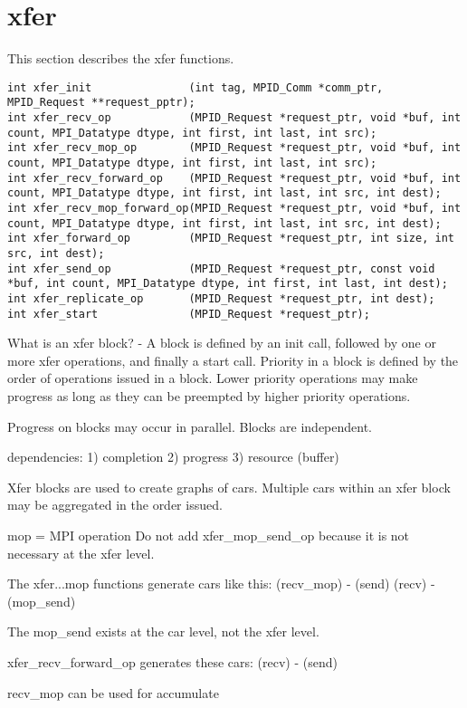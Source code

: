 \documentclass[dvipdfm,twoside,11pt]{article}
\begin{document}
\section{xfer}
This section describes the xfer functions.
\begin{verbatim}
int xfer_init               (int tag, MPID_Comm *comm_ptr, MPID_Request **request_pptr);
int xfer_recv_op            (MPID_Request *request_ptr, void *buf, int count, MPI_Datatype dtype, int first, int last, int src);
int xfer_recv_mop_op        (MPID_Request *request_ptr, void *buf, int count, MPI_Datatype dtype, int first, int last, int src);
int xfer_recv_forward_op    (MPID_Request *request_ptr, void *buf, int count, MPI_Datatype dtype, int first, int last, int src, int dest);
int xfer_recv_mop_forward_op(MPID_Request *request_ptr, void *buf, int count, MPI_Datatype dtype, int first, int last, int src, int dest);
int xfer_forward_op         (MPID_Request *request_ptr, int size, int src, int dest);
int xfer_send_op            (MPID_Request *request_ptr, const void *buf, int count, MPI_Datatype dtype, int first, int last, int dest);
int xfer_replicate_op       (MPID_Request *request_ptr, int dest);
int xfer_start              (MPID_Request *request_ptr);
\end{verbatim}

What is an xfer block? - A block is defined by an init call, followed by one 
or more xfer operations, and finally a start call.
Priority in a block is defined by the order of operations issued in a block.
Lower priority operations may make progress as long as they can be preempted
by higher priority operations.

Progress on blocks may occur in parallel.  Blocks are independent.

dependencies:
1) completion
2) progress
3) resource (buffer)

Xfer blocks are used to create graphs of cars. Multiple cars within an xfer 
block may be aggregated in the order issued.

mop = MPI operation
Do not add xfer_mop_send_op because it is not necessary at the xfer level.

The xfer...mop functions generate cars like this:
(recv_mop) - (send)
(recv) - (mop_send)

The mop_send exists at the car level, not the xfer level.

xfer_recv_forward_op generates these cars:
(recv) - (send)

recv_mop can be used for accumulate
\end{document}
